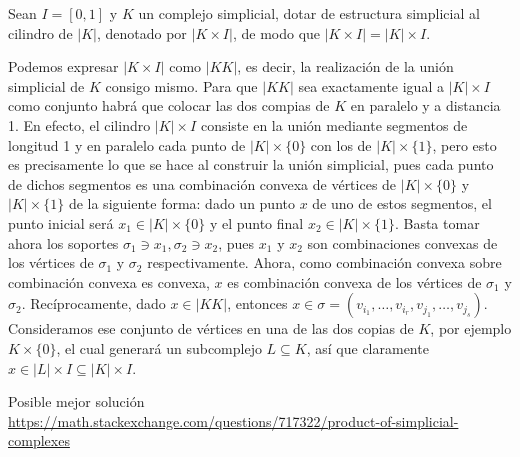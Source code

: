 \documentclass[twoside]{article}
\begin{document}
\begin{ejercicio}{1.12}
Sean $I = [0,1]$ y $K$ un complejo simplicial, dotar de estructura simplicial al cilindro de $|K|$, denotado por $|K \times I|$, de modo que $|K \times I| = |K| \times I$.
\end{ejercicio}
\begin{solucion}
Podemos expresar $|K\times I|$ como $|KK|$, es decir, la realización de la unión simplicial de $K$ consigo mismo. Para que $|KK|$ sea exactamente igual a $|K|\times I$ como conjunto habrá que colocar las dos compias de $K$ en paralelo y a distancia 1. En efecto, el cilindro $|K|\times I$ consiste en la unión mediante segmentos de longitud 1 y en paralelo cada punto de $|K|\times\{0\}$ con los de $|K|\times\{1\}$, pero esto es precisamente lo que se hace al construir la unión simplicial, pues cada punto de dichos segmentos es una combinación convexa de vértices de $|K|\times\{0\}$ y $|K|\times\{1\}$ de la siguiente forma: dado un punto $x$ de uno de estos segmentos, el punto inicial será $x_1\in |K|\times\{0\}$ y el punto final $x_2\in |K|\times\{1\}$. Basta tomar ahora los soportes $\sigma_1\ni x_1,\sigma_2\ni x_2$, pues $x_1$ y $x_2$ son combinaciones convexas de los vértices de $\sigma_1$ y $\sigma_2$ respectivamente. Ahora, como combinación convexa sobre combinación convexa es convexa, $x$ es combinación convexa de los vértices de $\sigma_1$ y $\sigma_2$. Recíprocamente, dado $x\in |KK|$, entonces $x\in \sigma=(v_{i_1},\dots, v_{i_r},v_{j_1},\dots,v_{j_s})$. Consideramos ese conjunto de vértices en una de las dos copias de $K$, por ejemplo $K\times\{0\}$, el cual generará un subcomplejo  $L\subseteq K$, así que claramente $x\in |L|\times I\subseteq |K|\times I$.

Posible mejor solución \url{https://math.stackexchange.com/questions/717322/product-of-simplicial-complexes}
\end{solucion}

\newpage
\end{document}
